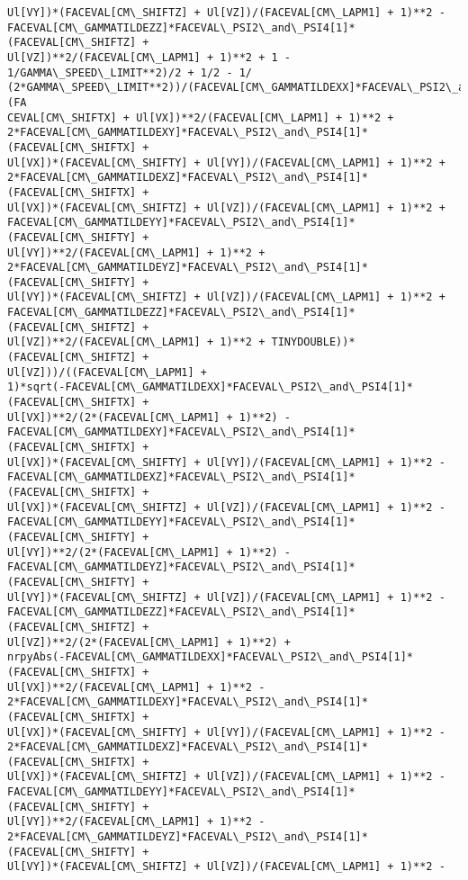\documentclass[landscape,letterpaper,10pt,english]{article}
\begin{document}
\begin{Verbatim}[commandchars=\\\{\}]
Ul[VY])*(FACEVAL[CM\_SHIFTZ] + Ul[VZ])/(FACEVAL[CM\_LAPM1] + 1)**2 -
FACEVAL[CM\_GAMMATILDEZZ]*FACEVAL\_PSI2\_and\_PSI4[1]*(FACEVAL[CM\_SHIFTZ] +
Ul[VZ])**2/(FACEVAL[CM\_LAPM1] + 1)**2 + 1 - 1/GAMMA\_SPEED\_LIMIT**2)/2 + 1/2 - 1/
(2*GAMMA\_SPEED\_LIMIT**2))/(FACEVAL[CM\_GAMMATILDEXX]*FACEVAL\_PSI2\_and\_PSI4[1]*(FA
CEVAL[CM\_SHIFTX] + Ul[VX])**2/(FACEVAL[CM\_LAPM1] + 1)**2 +
2*FACEVAL[CM\_GAMMATILDEXY]*FACEVAL\_PSI2\_and\_PSI4[1]*(FACEVAL[CM\_SHIFTX] +
Ul[VX])*(FACEVAL[CM\_SHIFTY] + Ul[VY])/(FACEVAL[CM\_LAPM1] + 1)**2 +
2*FACEVAL[CM\_GAMMATILDEXZ]*FACEVAL\_PSI2\_and\_PSI4[1]*(FACEVAL[CM\_SHIFTX] +
Ul[VX])*(FACEVAL[CM\_SHIFTZ] + Ul[VZ])/(FACEVAL[CM\_LAPM1] + 1)**2 +
FACEVAL[CM\_GAMMATILDEYY]*FACEVAL\_PSI2\_and\_PSI4[1]*(FACEVAL[CM\_SHIFTY] +
Ul[VY])**2/(FACEVAL[CM\_LAPM1] + 1)**2 +
2*FACEVAL[CM\_GAMMATILDEYZ]*FACEVAL\_PSI2\_and\_PSI4[1]*(FACEVAL[CM\_SHIFTY] +
Ul[VY])*(FACEVAL[CM\_SHIFTZ] + Ul[VZ])/(FACEVAL[CM\_LAPM1] + 1)**2 +
FACEVAL[CM\_GAMMATILDEZZ]*FACEVAL\_PSI2\_and\_PSI4[1]*(FACEVAL[CM\_SHIFTZ] +
Ul[VZ])**2/(FACEVAL[CM\_LAPM1] + 1)**2 + TINYDOUBLE))*(FACEVAL[CM\_SHIFTZ] +
Ul[VZ]))/((FACEVAL[CM\_LAPM1] +
1)*sqrt(-FACEVAL[CM\_GAMMATILDEXX]*FACEVAL\_PSI2\_and\_PSI4[1]*(FACEVAL[CM\_SHIFTX] +
Ul[VX])**2/(2*(FACEVAL[CM\_LAPM1] + 1)**2) -
FACEVAL[CM\_GAMMATILDEXY]*FACEVAL\_PSI2\_and\_PSI4[1]*(FACEVAL[CM\_SHIFTX] +
Ul[VX])*(FACEVAL[CM\_SHIFTY] + Ul[VY])/(FACEVAL[CM\_LAPM1] + 1)**2 -
FACEVAL[CM\_GAMMATILDEXZ]*FACEVAL\_PSI2\_and\_PSI4[1]*(FACEVAL[CM\_SHIFTX] +
Ul[VX])*(FACEVAL[CM\_SHIFTZ] + Ul[VZ])/(FACEVAL[CM\_LAPM1] + 1)**2 -
FACEVAL[CM\_GAMMATILDEYY]*FACEVAL\_PSI2\_and\_PSI4[1]*(FACEVAL[CM\_SHIFTY] +
Ul[VY])**2/(2*(FACEVAL[CM\_LAPM1] + 1)**2) -
FACEVAL[CM\_GAMMATILDEYZ]*FACEVAL\_PSI2\_and\_PSI4[1]*(FACEVAL[CM\_SHIFTY] +
Ul[VY])*(FACEVAL[CM\_SHIFTZ] + Ul[VZ])/(FACEVAL[CM\_LAPM1] + 1)**2 -
FACEVAL[CM\_GAMMATILDEZZ]*FACEVAL\_PSI2\_and\_PSI4[1]*(FACEVAL[CM\_SHIFTZ] +
Ul[VZ])**2/(2*(FACEVAL[CM\_LAPM1] + 1)**2) +
nrpyAbs(-FACEVAL[CM\_GAMMATILDEXX]*FACEVAL\_PSI2\_and\_PSI4[1]*(FACEVAL[CM\_SHIFTX] +
Ul[VX])**2/(FACEVAL[CM\_LAPM1] + 1)**2 -
2*FACEVAL[CM\_GAMMATILDEXY]*FACEVAL\_PSI2\_and\_PSI4[1]*(FACEVAL[CM\_SHIFTX] +
Ul[VX])*(FACEVAL[CM\_SHIFTY] + Ul[VY])/(FACEVAL[CM\_LAPM1] + 1)**2 -
2*FACEVAL[CM\_GAMMATILDEXZ]*FACEVAL\_PSI2\_and\_PSI4[1]*(FACEVAL[CM\_SHIFTX] +
Ul[VX])*(FACEVAL[CM\_SHIFTZ] + Ul[VZ])/(FACEVAL[CM\_LAPM1] + 1)**2 -
FACEVAL[CM\_GAMMATILDEYY]*FACEVAL\_PSI2\_and\_PSI4[1]*(FACEVAL[CM\_SHIFTY] +
Ul[VY])**2/(FACEVAL[CM\_LAPM1] + 1)**2 -
2*FACEVAL[CM\_GAMMATILDEYZ]*FACEVAL\_PSI2\_and\_PSI4[1]*(FACEVAL[CM\_SHIFTY] +
Ul[VY])*(FACEVAL[CM\_SHIFTZ] + Ul[VZ])/(FACEVAL[CM\_LAPM1] + 1)**2 -

\end{Verbatim}
\end{document}
